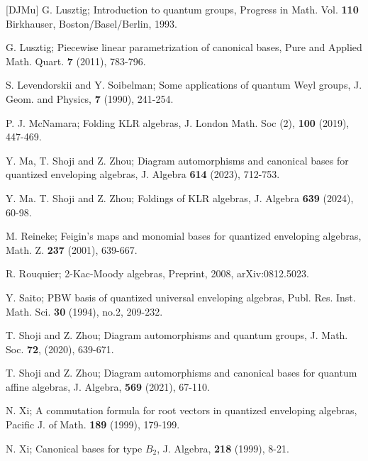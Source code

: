 \documentclass[12pt]{amsart}
\renewcommand{\1}{\mathbb 1}
\numberwithin{equation}{section}
\begin{document}
\begin{thebibliography}{[DJMu]}
 G. Lusztig; Introduction to quantum groups, Progress in Math.
Vol. {\bf 110} Birkhauser, Boston/Basel/Berlin, 1993.

 G. Lusztig; Piecewise linear parametrization of canonical bases,
  Pure and Applied Math. Quart. {\bf 7} (2011), 783-796. 

 S. Levendorskii and Y. Soibelman; Some applications of quantum
Weyl groups, J. Geom. and Physics, {\bf 7} (1990), 241-254.  

 P. J. McNamara; Folding KLR algebras, J. London Math. Soc (2),
{\bf 100} (2019), 447-469. 

 Y. Ma, T. Shoji and Z. Zhou; Diagram automorphisms and 
canonical bases for quantized enveloping algebras, J. Algebra {\bf 614} (2023), 712-753.   

 Y. Ma. T. Shoji and Z. Zhou; Foldings of KLR algebras,
J. Algebra {\bf 639} (2024), 60-98.   

 M. Reineke; Feigin's maps and monomial bases for
quantized enveloping algebras, Math. Z. {\bf 237} (2001), 639-667.  


 R. Rouquier; 2-Kac-Moody algebras, Preprint, 2008, arXiv:0812.5023.


 Y. Saito; PBW basis of quantized universal enveloping algebras,
Publ. Res. Inst. Math. Sci. {\bf 30} (1994), no.2, 209-232.   
  
 T. Shoji and Z. Zhou; Diagram automorphisms and quantum groups,
J. Math. Soc. {\bf 72}, (2020), 639-671.

 T. Shoji and Z. Zhou; Diagram automorphisms and canonical bases
for quantum affine algebras, J. Algebra, {\bf 569} (2021), 67-110.   


 N. Xi; A commutation formula for root vectors in quantized
enveloping algebras, Pacific J. of Math. {\bf 189} (1999), 179-199. 

 N. Xi; Canonical bases for type $B_2$, J. Algebra, {\bf 218} (1999),
8-21.
\end{thebibliography}
\end{document}
